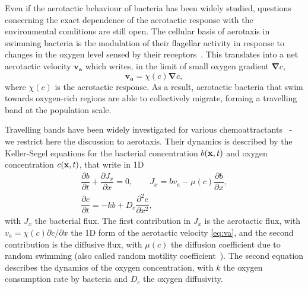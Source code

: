 \documentclass[aps,a4paper,twocolumn,10pt,pre,showpacs]{revtex4-2}
\begin{document}
Even if the aerotactic behaviour of bacteria has been widely studied, questions concerning the exact dependence of the aerotactic response with the environmental conditions are still open.
The  cellular basis of aerotaxis in swimming bacteria is the modulation of their flagellar activity in response to changes in the oxygen level sensed by their receptors~\cite{Hou2000,Stock1997,rebbapragada1997aer,bibikov1997signal,yu_aerotactic_2002}. This translates into a net aerotactic velocity $\bm{v_a}$ which writes, in the limit of small oxygen gradient $\boldsymbol{\nabla} c$, 
\begin{equation}
\label{eq:va}
\bm{v_a} = \chi(c) \boldsymbol{\nabla} c,
\end{equation}
where $\chi(c)$ is the aerotactic response. As a result, aerotactic bacteria that swim towards oxygen-rich regions are able to collectively migrate, forming a travelling band at the population scale.

Travelling bands have been widely investigated for various chemoattractants~\cite{sherris_influence_1957,Baracchini1959,adler1966chemotaxis,adler1966effect} - we restrict here the discussion to aerotaxis. Their dynamics is described by the Keller-Segel equations for the bacterial concentration $b({\bf x},t)$ and oxygen concentration $c({\bf x},t)$, that write in 1D~\cite{keller1971traveling}
\begin{eqnarray}
\dfrac{\partial b}{\partial t} + \dfrac{\partial J_x}{\partial x} =0 ,  \qquad J_x=b v_a - \mu(c) \dfrac{\partial b}{\partial x}, \\
\dfrac{\partial c}{\partial t} = -k b + D_c \dfrac{\partial^2 c}{\partial x^2},
\label{eq:ks}
\end{eqnarray}
with $J_x$ the bacterial flux. The first contribution in $J_x$ is the aerotactic flux, with $v_a = \chi(c) \partial c/\partial x$ the 1D form of the aerotactic velocity \eqref{eq:va}, and the second contribution is the diffusive flux, with $\mu(c)$ the diffusion coefficient due to random swimming (also called random motility coefficient~\cite{rivero1989transport,ford1991measurement2,lewus2001quantification}). The second equation describes the dynamics of the oxygen concentration, with $k$ the oxygen consumption rate by bacteria and $D_c$ the oxygen diffusivity.
\end{document}
